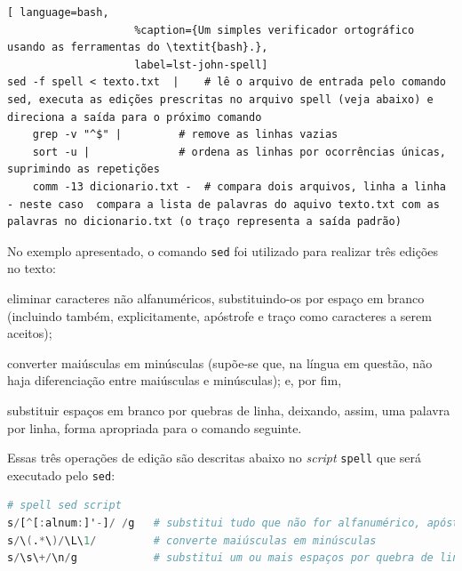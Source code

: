 \documentclass{textolivre}
\begin{document}
\begin{lstlisting}[ language=bash,
                    %caption={Um simples verificador ortográfico usando as ferramentas do \textit{bash}.},
                    label=lst-john-spell]
sed -f spell < texto.txt  |    # lê o arquivo de entrada pelo comando sed, executa as edições prescritas no arquivo spell (veja abaixo) e direciona a saída para o próximo comando
    grep -v "^$" |	       # remove as linhas vazias
    sort -u |		       # ordena as linhas por ocorrências únicas, suprimindo as repetições
    comm -13 dicionario.txt -  # compara dois arquivos, linha a linha - neste caso  compara a lista de palavras do aquivo texto.txt com as palavras no dicionario.txt (o traço representa a saída padrão)
\end{lstlisting} %

No exemplo apresentado, o comando \texttt{sed} foi utilizado para realizar três edições no texto:
\begin{enumerate*}[label={\arabic*)}]
\item eliminar caracteres não alfanuméricos, substituindo-os por espaço em branco (incluindo também, explicitamente,
apóstrofe e traço como caracteres a serem aceitos);
\item converter maiúsculas em minúsculas (supõe-se que, na língua em questão, não haja diferenciação entre
maiúsculas e minúsculas);
e, por fim, 
\item substituir espaços em branco por quebras de linha, deixando, assim, uma palavra por linha, forma apropriada
para o comando seguinte.
\end{enumerate*}
Essas três operações de edição são descritas abaixo no \textit{script} \texttt{spell} que será executado pelo \texttt{sed}:
\begin{lstlisting}[language=awk, label=lst-sed-spell]
# spell sed script
s/[^[:alnum:]'-]/ /g   # substitui tudo que não for alfanumérico, apóstrofe ou traço por espaço em branco
s/\(.*\)/\L\1/         # converte maiúsculas em minúsculas
s/\s\+/\n/g            # substitui um ou mais espaços por quebra de linha, de forma que cada palavra esteja disposta sozinha em uma linha 
\end{lstlisting} %
\end{document}
